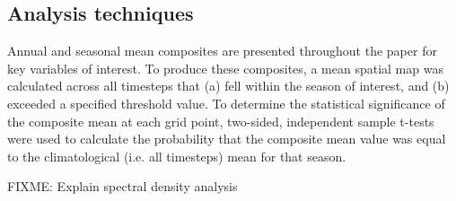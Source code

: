 \subsection{Analysis techniques}

Annual and seasonal mean composites are presented throughout the paper for key variables of interest. To produce these composites, a mean spatial map was calculated across all timesteps that (a) fell within the season of interest, and (b) exceeded a specified threshold value. To determine the statistical significance of the composite mean at each grid point, two-sided, independent sample t-tests were used to calculate the probability that the composite mean value was equal to the climatological (i.e. all timesteps) mean for that season.    

FIXME: Explain spectral density analysis